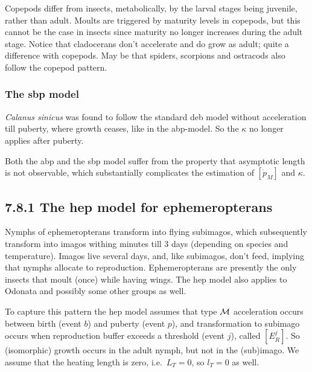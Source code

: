 Copepods differ from insects, metabolically, by the larval stages being juvenile, rather than adult. 
Moults are triggered by maturity levels in copepods, but this cannot be the case in insects since maturity no longer increases during the adult stage.
Notice that cladocerans don't accelerate and do grow as adult; quite a difference with copepods.
May be that spiders, scorpions and ostracods also follow the copepod pattern.

\subsubsection*{The sbp model} 

\emph{Calanus sinicus} was found to follow the standard {\sc deb} model without acceleration till puberty, where growth ceases, like in the abp-model.
So the $\kappa$ no longer applies after puberty.

Both the abp and the sbp model suffer from the property that asymptotic length is not observable, which substantially complicates the estimation of $[\dot{p}_M]$ and $\kappa$.

\subsection*{7.8.1 The hep model for ephemeropterans}
{}
\label{ssec_c:Ephemeropterans}

Nymphs of ephemeropterans transform into flying subimagos, which subsequently transform into imagos withing minutes till 3 days (depending on species and temperature).
Imagos live several days, and, like subimagos, don't feed, implying that nymphs allocate to reproduction.
Ephemeropterans are presently the only insects that moult (once) while having wings.
The hep model also applies to Odonata and possibly some other groups as well.

To capture this pattern the hep model assumes that type $\cal M$ acceleration occurs between birth (event $b$) and puberty (event $p$), and transformation to subimago occurs when reproduction buffer exceeds a threshold (event $j$), called $[E_R^j]$. 
So (isomorphic) growth occurs in the adult nymph, but not in the (sub)imago.
We assume that the heating length is zero, i.e.\ $L_T = 0$, so $l_T = 0$ as well.

